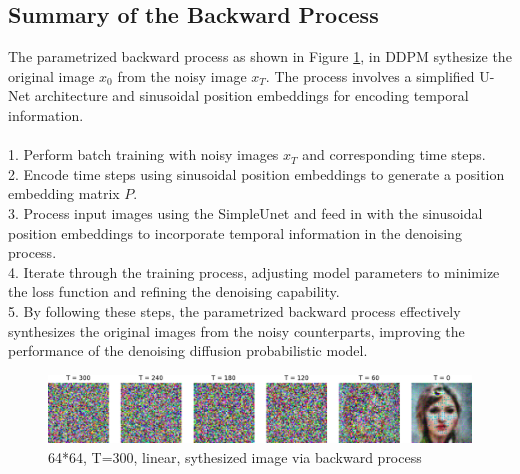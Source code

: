 \documentclass[letterpaper]{article} %
\begin{document}
\subsection{Summary of the Backward Process}
The parametrized backward process as shown in Figure \ref{fig:figure4}, in DDPM sythesize the original image $x_0$ from the noisy image $x_T$. The process involves a simplified U-Net architecture and sinusoidal position embeddings for encoding temporal information.\\\\
1. Perform batch training with noisy images $x_T$ and corresponding time steps.\\
2. Encode time steps using sinusoidal position embeddings to generate a position embedding matrix $P$.\\
3. Process input images using the SimpleUnet and feed in with the sinusoidal position embeddings to incorporate temporal information in the denoising process.\\
4. Iterate through the training process, adjusting model parameters to minimize the loss function and refining the denoising capability.\\
5. By following these steps, the parametrized backward process effectively synthesizes the original images from the noisy counterparts, improving the performance of the denoising diffusion probabilistic model.

\begin{figure}[htbp]
    \centering
    \includegraphics[width=0.88\linewidth]{f4.jpg} %
    \caption{64*64, T=300, linear, sythesized image via backward process}
    \label{fig:figure4}
\end{figure}


\end{document}
